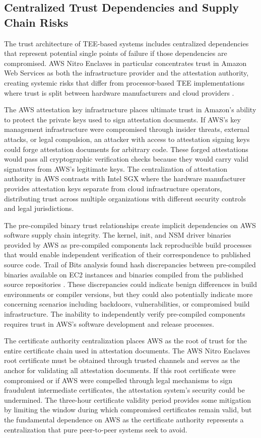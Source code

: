 \subsection{Centralized Trust Dependencies and Supply Chain Risks}

The trust architecture of TEE-based systems includes centralized dependencies that represent potential single points of failure if those dependencies are compromised. AWS Nitro Enclaves in particular concentrates trust in Amazon Web Services as both the infrastructure provider and the attestation authority, creating systemic risks that differ from processor-based TEE implementations where trust is split between hardware manufacturers and cloud providers \cite{trail_of_bits_nitro}.

The AWS attestation key infrastructure places ultimate trust in Amazon's ability to protect the private keys used to sign attestation documents. If AWS's key management infrastructure were compromised through insider threats, external attacks, or legal compulsion, an attacker with access to attestation signing keys could forge attestation documents for arbitrary code. These forged attestations would pass all cryptographic verification checks because they would carry valid signatures from AWS's legitimate keys. The centralization of attestation authority in AWS contrasts with Intel SGX where the hardware manufacturer provides attestation keys separate from cloud infrastructure operators, distributing trust across multiple organizations with different security controls and legal jurisdictions.

The pre-compiled binary trust relationships create implicit dependencies on AWS software supply chain integrity. The kernel, init, and NSM driver binaries provided by AWS as pre-compiled components lack reproducible build processes that would enable independent verification of their correspondence to published source code. Trail of Bits analysis found hash discrepancies between pre-compiled binaries available on EC2 instances and binaries compiled from the published source repositories \cite{trail_of_bits_nitro}. These discrepancies could indicate benign differences in build environments or compiler versions, but they could also potentially indicate more concerning scenarios including backdoors, vulnerabilities, or compromised build infrastructure. The inability to independently verify pre-compiled components requires trust in AWS's software development and release processes.

The certificate authority centralization places AWS as the root of trust for the entire certificate chain used in attestation documents. The AWS Nitro Enclaves root certificate must be obtained through trusted channels and serves as the anchor for validating all attestation documents. If this root certificate were compromised or if AWS were compelled through legal mechanisms to sign fraudulent intermediate certificates, the attestation system's security could be undermined. The three-hour certificate validity period provides some mitigation by limiting the window during which compromised certificates remain valid, but the fundamental dependence on AWS as the certificate authority represents a centralization that pure peer-to-peer systems seek to avoid.

